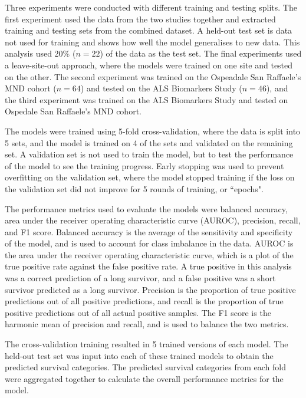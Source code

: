 Three experiments were conducted with different training and testing splits.
The first experiment used the data from the two studies together and extracted training and testing sets from the combined dataset.
A held-out test set is data not used for training and shows how well the model generalises to new data.
This analysis used 20\% ($n=22$) of the data as the test set.
The final experiments used a leave-site-out approach, where the models were trained on one site and tested on the other.
The second experiment was trained on the Ospeadale San Raffaele's MND cohort ($n=64$) and tested on the ALS Biomarkers Study ($n=46$), and the third experiment was trained on the ALS Biomarkers Study and tested on Ospedale San Raffaele's MND cohort.

The models were trained using 5-fold cross-validation, where the data is split into 5 sets, and the model is trained on 4 of the sets and validated on the remaining set.
A validation set is not used to train the model, but to test the performance of the model to see the training progress.
Early stopping was used to prevent overfitting on the validation set, where the model stopped training if the loss on the validation set did not improve for 5 rounds of training, or ``epochs".

The performance metrics used to evaluate the models were balanced accuracy, area under the receiver operating characteristic curve (AUROC), precision, recall, and F1 score.
Balanced accuracy is the average of the sensitivity and specificity of the model, and is used to account for class imbalance in the data.
AUROC is the area under the receiver operating characteristic curve, which is a plot of the true positive rate against the false positive rate.
A true positive in this analysis was a correct prediction of a long survivor, and a false positive was a short survivor predicted as a long survivor.
Precision is the proportion of true positive predictions out of all positive predictions, and recall is the proportion of true positive predictions out of all actual positive samples.
The F1 score is the harmonic mean of precision and recall, and is used to balance the two metrics.

The cross-validation training resulted in 5 trained versions of each model.
The held-out test set was input into each of these trained models to obtain the predicted survival categories.
The predicted survival categories from each fold were aggregated together to calculate the overall performance metrics for the model.


